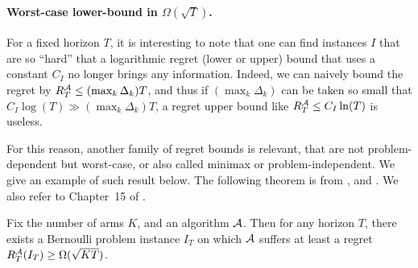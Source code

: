 \paragraph{Worst-case lower-bound in $\Omega(\sqrt{T})$.}
%
For a fixed horizon $T$, it is interesting to note that one can find instances $I$ that are so ``hard'' that a logarithmic regret (lower or upper) bound that uses a constant $C_I$ no longer brings any information.
Indeed, we can naively bound the regret by $R_T^{\mathcal{A}} \leq (\max_k \Delta_k) T$, and thus if $(\max_k \Delta_k)$ can be taken so small that $C_I \log(T) \gg (\max_k \Delta_k) T$, a regret upper bound like $R_T^{\mathcal{A}} \leq C_I \ln(T)$ is useless.
%

For this reason, another family of regret bounds is relevant, that are not problem-dependent but worst-case, or also called minimax \cite{Audibert2009minimax,audibert2010minimax} or problem-independent.
We give an example of such result below.
The following theorem is from \cite{Auer02NonStochastic}, and \cite[Theorem~2.1]{Slivkins2019}.
%
We also refer to Chapter~15 of \cite{LattimoreBanditAlgorithmsBook}.

\begin{theorem}\label{thm:2:worstCaseLowerBound}
\begin{leftbar}[theorembar]  %
    Fix the number of arms $K$, and an algorithm $\mathcal{A}$.
    Then for any horizon $T$, there exists a Bernoulli problem instance $I_T$ on which $\mathcal{A}$ suffers at least a regret $R_T^{\mathcal{A}}(I_T) \geq \Omega(\sqrt{K T})$.
\end{leftbar}  %
\end{theorem}

